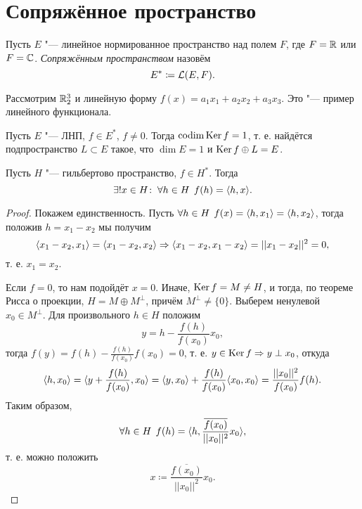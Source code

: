 \documentclass[main]{subfiles}
\begin{document}
\section{Сопряжённое пространство} %

\begin{definition}
  Пусть \( E \) "--- линейное нормированное пространство
  над полем \( F \),
  где \( F = \mathbb{R} \) или \( F = \mathbb{C} \).
  \emph{Сопряжённым пространством} назовём
  \[ E^* \coloneqq \Linears{E}[F]. \]
\end{definition}

\begin{example}
  Рассмотрим \( \mathbb{R}_2^3 \) и линейную форму
  \( f(x) = a_1 x_1 + a_2 x_2 + a_3 x_3 \).
  Это "--- пример линейного функционала.
\end{example}

\begin{exercise}
  Пусть \( E \) "--- ЛНП, \( f \in E^* \), \( f \ne 0 \).
  Тогда \( \operatorname{codim} \operatorname{Ker} f = 1 \),
  т. е. найдётся подпространство \( L \subset E \)
  такое, что \( \dim E = 1 \) и \( \operatorname{Ker} f \oplus L = E \).
\end{exercise}

\begin{theorem}
  Пусть \( H \) "--- гильбертово пространство,
  \( f \in H^* \). Тогда
  \[ \exists! x \in H \colon \: \forall {h \in H} \; \, f(h) = \langle h, x \rangle. \]
\end{theorem}
\begin{proof}
  Покажем единственность.
  Пусть
  \( \forall {h \in H} \; \, f(x) = \langle h, x_1 \rangle = \langle h, x_2 \rangle \),
  тогда положив \( h = x_1 - x_2 \)
  мы получим
  \[
    \langle x_1 - x_2, x_1 \rangle =
    \langle x_1 - x_2, x_2 \rangle \Rightarrow
    \langle x_1 - x_2, x_1 - x_2 \rangle = ||x_1 - x_2||^2 = 0,
  \]
  т. е. \( x_1 = x_2 \).

  Если \( f = 0 \), то нам подойдёт \( x = 0 \).
  Иначе, \( \operatorname{Ker} f = M \ne H \),
  и тогда, по теореме Рисса о проекции,
  \( H = M \oplus M^\perp \),
  причём \( M^\perp \ne \{ 0 \} \).
  Выберем ненулевой \( x_0 \in M^\perp \). Для произвольного
  \( h \in H \) положим
  \[
    y = h - \frac{f(h)}{f(x_0)} x_0,
  \]
  тогда \( f(y) = f(h) - \frac{f(h)}{f(x_0)} f(x_0) = 0 \),
  т. е. \( y \in \operatorname{Ker} f \Rightarrow y \perp x_0 \),
  откуда
  \[
    \langle h, x_0 \rangle = \langle y + \frac{f(h)}{f(x_0)}, x_0 \rangle =
    \langle y, x_0 \rangle + \frac{f(h)}{f(x_0)} \langle x_0, x_0 \rangle =
    \frac{||x_0||^2}{f(x_0)} f(h).
  \]
  Таким образом,
  \[
    \forall {h \in H} \; \, f(h) = \langle h, \frac{\overline{f(x_0)}}{||x_0||^2} x_0 \rangle,
  \]
  т. е. можно положить
  \[ x \coloneqq \frac{\overline{f(x_0)}}{||x_0||^2} x_0. \]
\end{proof}
\end{document}
